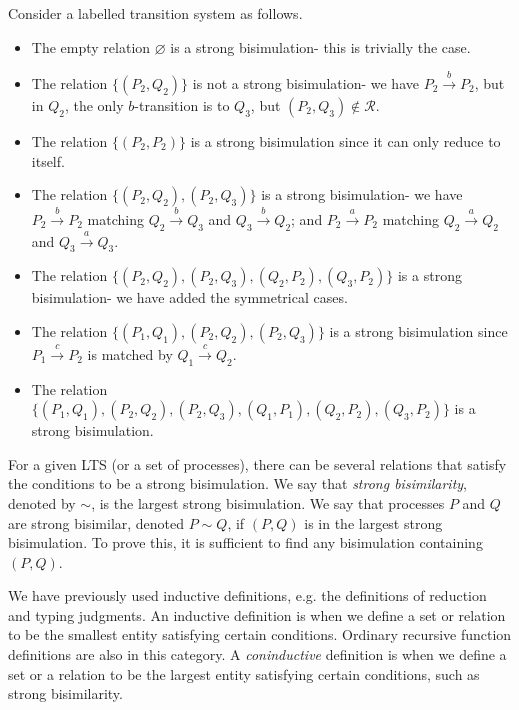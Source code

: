 \documentclass[a4paper, openany]{memoir}
\theoremstyle{definition}
\begin{document}
    Consider a labelled transition system as follows.
    \begin{itemize}
        \item The empty relation $\varnothing$ is a strong bisimulation- this is trivially the case.
        \item The relation $\{(P_2, Q_2)\}$ is not a strong bisimulation- we have $P_2 \xrightarrow{b} P_2$, but in $Q_2$, the only $b$-transition is to $Q_3$, but $(P_2, Q_3) \not\in \mathcal{R}$.
        \item The relation $\{(P_2, P_2)\}$ is a strong bisimulation since it can only reduce to itself.
        \item The relation $\{(P_2, Q_2), (P_2, Q_3)\}$ is a strong bisimulation- we have $P_2 \xrightarrow{b} P_2$ matching $Q_2 \xrightarrow{b} Q_3$ and $Q_3 \xrightarrow{b} Q_2$; and $P_2 \xrightarrow{a} P_2$ matching $Q_2 \xrightarrow{a} Q_2$ and $Q_3 \xrightarrow{a} Q_3$.
        \item The relation $\{(P_2, Q_2), (P_2, Q_3), (Q_2, P_2), (Q_3, P_2)\}$ is a strong bisimulation- we have added the symmetrical cases.
        \item The relation $\{(P_1, Q_1), (P_2, Q_2), (P_2, Q_3)\}$ is a strong bisimulation since $P_1 \xrightarrow{c} P_2$ is matched by $Q_1 \xrightarrow{c} Q_2$.
        \item The relation $\{(P_1, Q_1), (P_2, Q_2), (P_2, Q_3), (Q_1, P_1), (Q_2, P_2), (Q_3, P_2)\}$ is a strong bisimulation.
    \end{itemize}

    For a given LTS (or a set of processes), there can be several relations that satisfy the conditions to be a strong bisimulation. We say that \emph{strong bisimilarity}, denoted by $\sim$, is the largest strong bisimulation. We say that processes $P$ and $Q$ are strong bisimilar, denoted $P \sim Q$, if $(P, Q)$ is in the largest strong bisimulation. To prove this, it is sufficient to find any bisimulation containing $(P, Q)$.

    We have previously used inductive definitions, e.g. the definitions of reduction and typing judgments. An inductive definition is when we define a set or relation to be the smallest entity satisfying certain conditions. Ordinary recursive function definitions are also in this category. A \emph{coninductive} definition is when we define a set or a relation to be the largest entity satisfying certain conditions, such as strong bisimilarity.

\end{document}
